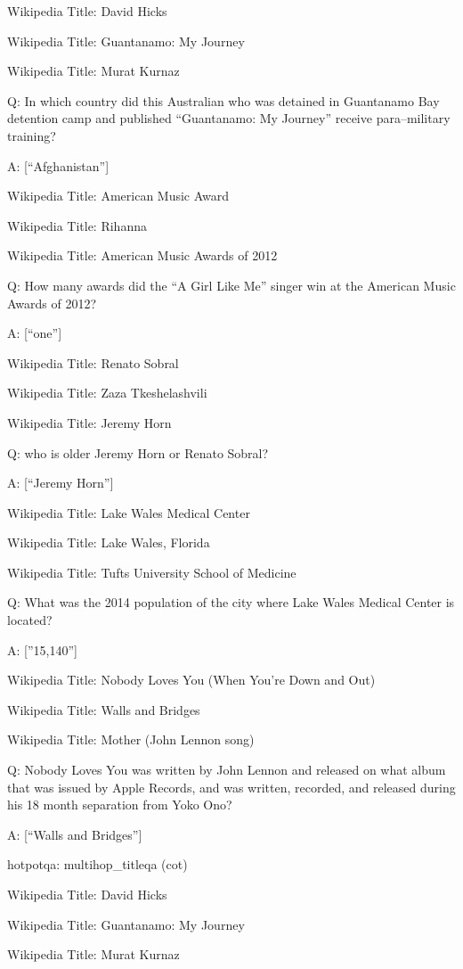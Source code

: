 \documentclass[
]{article}
\begin{document}
Wikipedia Title: David Hicks

Wikipedia Title: Guantanamo: My Journey

Wikipedia Title: Murat Kurnaz

Q: In which country did this Australian who was detained in Guantanamo
Bay detention camp and published ``Guantanamo: My Journey'' receive
para--military training?

A: {[}``Afghanistan''{]}

Wikipedia Title: American Music Award

Wikipedia Title: Rihanna

Wikipedia Title: American Music Awards of 2012

Q: How many awards did the ``A Girl Like Me'' singer win at the American
Music Awards of 2012?

A: {[}``one''{]}

Wikipedia Title: Renato Sobral

Wikipedia Title: Zaza Tkeshelashvili

Wikipedia Title: Jeremy Horn

Q: who is older Jeremy Horn or Renato Sobral?

A: {[}``Jeremy Horn''{]}

Wikipedia Title: Lake Wales Medical Center

Wikipedia Title: Lake Wales, Florida

Wikipedia Title: Tufts University School of Medicine

Q: What was the 2014 population of the city where Lake Wales Medical
Center is located?

A: {[}''15,140''{]}

Wikipedia Title: Nobody Loves You (When You're Down and Out)

Wikipedia Title: Walls and Bridges

Wikipedia Title: Mother (John Lennon song)

Q: Nobody Loves You was written by John Lennon and released on what
album that was issued by Apple Records, and was written, recorded, and
released during his 18 month separation from Yoko Ono?

A: {[}``Walls and Bridges''{]}

hotpotqa: multihop\_titleqa (cot)

Wikipedia Title: David Hicks

Wikipedia Title: Guantanamo: My Journey

Wikipedia Title: Murat Kurnaz
\end{document}
